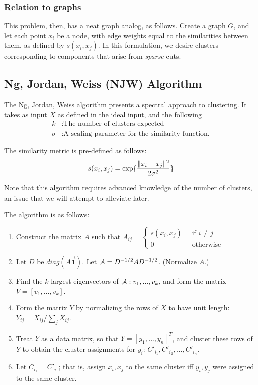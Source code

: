 \subsubsection{Relation to graphs}
This problem, then, has a neat graph analog, as follows. Create a graph $G$, and
let each point $x_i$ be a node, with edge weights equal to the
similarities between them, as defined by $s(x_i, x_j)$. In this formulation, we
desire clusters corresponding to components that arise from \textit{sparse}
cuts.

\subsection{Ng, Jordan, Weiss (NJW) Algorithm}
The Ng, Jordan, Weiss algorithm presents a spectral approach to clustering. It
takes as input $X$ as defined in the ideal input, and the following
\begin{align*}
    k &: \text{The number of clusters expected} \\
    \sigma &: \text{A scaling parameter for the similarity function.}
\end{align*}

The similarity metric is pre-defined as follows:
\begin{align*}
    s(x_i, x_j) = \exp\{\frac{\lVert x_i - x_j\rVert^2}{2\sigma^2}\}
\end{align*}

Note that this algorithm requires advanced knowledge of the number of clusters,
an issue that we will attempt to alleviate later.

The algorithm is as follows:
\begin{enumerate}
    \item Construct the matrix $A$ such that $A_{ij} = \begin{cases}s(x_i, x_j) &\;\text{ if } i \neq j \\
                                                                    0           &\;\text{ otherwise}\end{cases}$
    \item Let $D$ be $diag(A \vec{\mathbf{1}})$. Let $\mathcal{A} = D^{-1/2} A D^{-1/2}$. (Normalize $A$.)
    \item Find the $k$ largest eigenvectors of $\mathcal{A}: v_1,...,v_k$, and form the
            matrix $V = [v_1, ..., v_k]$.
    \item Form the matrix $Y$ by normalizing the rows of $X$ to have unit length:
            $Y_{ij} = X_{ij} / \sum_j X_{ij}$.
    \item Treat $Y$ as a data matrix, so that $Y = [y_1, ..., y_n]^T$, and
        cluster these rows of $Y$ to obtain the cluster assignments for $y_i$:
        $C'_{i_1}, C'_{i_2}, ..., C'_{i_n}$.
    \item Let $C_{i_1} = C'_{i_1}$; that is, assign $x_i, x_j$ to the same cluster
        iff $y_i, y_j$ were assigned to the same cluster.
\end{enumerate}


